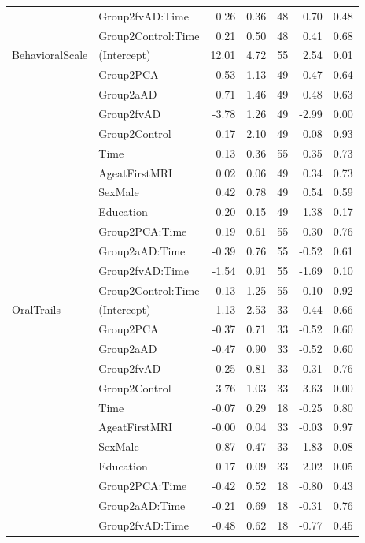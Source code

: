 \documentclass[]{article}
\begin{document}
\begin{table}[ht]
{\begin{tabular}{llrrrrr}
   & Group2fvAD:Time & 0.26 & 0.36 & 48 & 0.70 & 0.48 \\ 
   & Group2Control:Time & 0.21 & 0.50 & 48 & 0.41 & 0.68 \\ 
  BehavioralScale & (Intercept) & 12.01 & 4.72 & 55 & 2.54 & 0.01 \\ 
   & Group2PCA & -0.53 & 1.13 & 49 & -0.47 & 0.64 \\ 
   & Group2aAD & 0.71 & 1.46 & 49 & 0.48 & 0.63 \\ 
   & Group2fvAD & -3.78 & 1.26 & 49 & -2.99 & 0.00 \\ 
   & Group2Control & 0.17 & 2.10 & 49 & 0.08 & 0.93 \\ 
   & Time & 0.13 & 0.36 & 55 & 0.35 & 0.73 \\ 
   & AgeatFirstMRI & 0.02 & 0.06 & 49 & 0.34 & 0.73 \\ 
   & SexMale & 0.42 & 0.78 & 49 & 0.54 & 0.59 \\ 
   & Education & 0.20 & 0.15 & 49 & 1.38 & 0.17 \\ 
   & Group2PCA:Time & 0.19 & 0.61 & 55 & 0.30 & 0.76 \\ 
   & Group2aAD:Time & -0.39 & 0.76 & 55 & -0.52 & 0.61 \\ 
   & Group2fvAD:Time & -1.54 & 0.91 & 55 & -1.69 & 0.10 \\ 
   & Group2Control:Time & -0.13 & 1.25 & 55 & -0.10 & 0.92 \\ 
  OralTrails & (Intercept) & -1.13 & 2.53 & 33 & -0.44 & 0.66 \\ 
   & Group2PCA & -0.37 & 0.71 & 33 & -0.52 & 0.60 \\ 
   & Group2aAD & -0.47 & 0.90 & 33 & -0.52 & 0.60 \\ 
   & Group2fvAD & -0.25 & 0.81 & 33 & -0.31 & 0.76 \\ 
   & Group2Control & 3.76 & 1.03 & 33 & 3.63 & 0.00 \\ 
   & Time & -0.07 & 0.29 & 18 & -0.25 & 0.80 \\ 
   & AgeatFirstMRI & -0.00 & 0.04 & 33 & -0.03 & 0.97 \\ 
   & SexMale & 0.87 & 0.47 & 33 & 1.83 & 0.08 \\ 
   & Education & 0.17 & 0.09 & 33 & 2.02 & 0.05 \\ 
   & Group2PCA:Time & -0.42 & 0.52 & 18 & -0.80 & 0.43 \\ 
   & Group2aAD:Time & -0.21 & 0.69 & 18 & -0.31 & 0.76 \\ 
   & Group2fvAD:Time & -0.48 & 0.62 & 18 & -0.77 & 0.45 \\ 

\end{tabular}}
\end{table}
\end{document}
